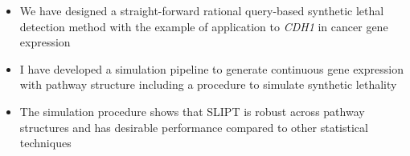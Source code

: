     \begin{itemize}
      \item We have designed a straight-forward rational query-based synthetic lethal detection method with the example of application to \textit{CDH1} in cancer gene expression
      
      \bigskip
      
      \item I have developed a simulation pipeline to generate continuous gene expression with pathway structure including a procedure to simulate synthetic lethality 
      
      \bigskip
      
      \item The simulation procedure shows that SLIPT is robust across pathway structures and has desirable performance compared to other statistical techniques 
      \end{itemize}